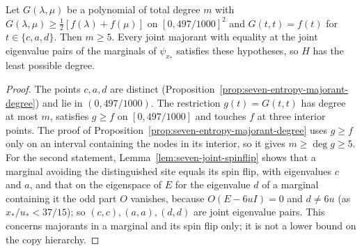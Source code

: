 \begin{corollary}\label{cor:seven-joint-degree-five}
Let $G(\lambda,\mu)$ be a polynomial of total degree $m$ with $G(\lambda,\mu)\ge\tfrac12[f(\lambda)+f(\mu)]$ on
$[0,497/1000]^2$ and $G(t,t)=f(t)$ for $t\in\{c,a,d\}$. Then $m\ge5$. Every joint majorant with equality at the
joint eigenvalue pairs of the marginals of $\psi_{x_*}$ satisfies these hypotheses, so $H$ has the least possible degree.
\end{corollary}
\begin{proof}
The points $c,a,d$ are distinct (Proposition~\ref{prop:seven-entropy-majorant-degree}) and lie in $(0,497/1000)$.
The restriction $g(t)=G(t,t)$ has degree at most $m$, satisfies $g\ge f$ on $[0,497/1000]$ and touches $f$ at three
interior points. The proof of Proposition~\ref{prop:seven-entropy-majorant-degree} uses $g\ge f$ only on an interval
containing the nodes in its interior, so it gives $m\ge\deg g\ge5$. For the second statement, Lemma~\ref{lem:seven-joint-spinflip}
shows that a marginal avoiding the distinguished site equals its spin flip, with eigenvalues $c$ and $a$, and that on the
eigenspace of $E$ for the eigenvalue $d$ of a marginal containing it the odd part $O$ vanishes, because $O(E-6uI)=0$
and $d\ne6u$ (as $x_*/u_*<37/15$); so $(c,c),(a,a),(d,d)$ are joint
eigenvalue pairs. This concerns majorants in a marginal and its spin flip only; it is not a lower bound on the copy
hierarchy.
\end{proof}

